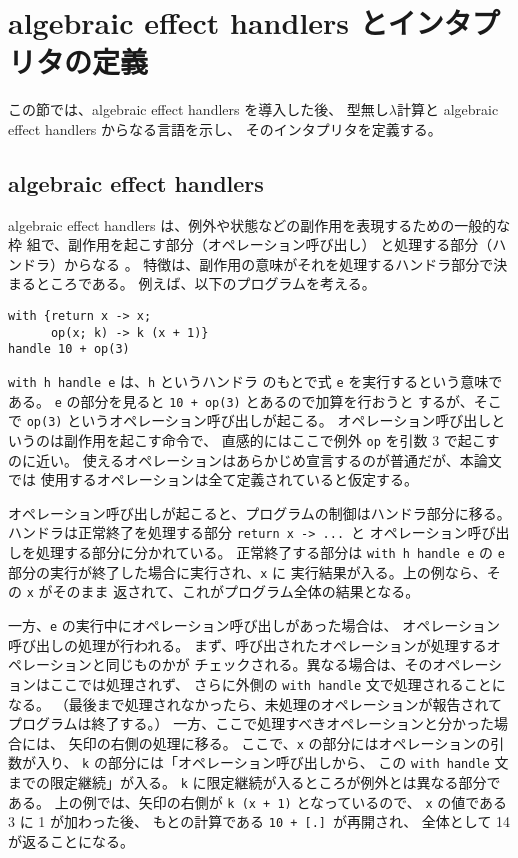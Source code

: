 \section{algebraic effect handlers とインタプリタの定義}
\label{section:definition}

この節では、algebraic effect handlers を導入した後、
型無し$\lambda$計算と algebraic effect handlers からなる言語を示し、
そのインタプリタを定義する。

\subsection{algebraic effect handlers}
\label{subsection:algebraic effect handlers}

algebraic effect handlers は、例外や状態などの副作用を表現するための一般的な枠
組で、副作用を起こす部分（オペレーション呼び出し）
と処理する部分（ハンドラ）からなる \cite{PRETNAR201519}。
特徴は、副作用の意味がそれを処理するハンドラ部分で決まるところである。
例えば、以下のプログラムを考える。
\begin{verbatim}
with {return x -> x;
      op(x; k) -> k (x + 1)}
handle 10 + op(3)
\end{verbatim}
\texttt{with h handle e} は、\texttt{h} というハンドラ
のもとで式 \texttt{e} を実行するという意味である。
\texttt{e} の部分を見ると \texttt{10 + op(3)} とあるので加算を行おうと
するが、そこで \texttt{op(3)} というオペレーション呼び出しが起こる。
オペレーション呼び出しというのは副作用を起こす命令で、
直感的にはここで例外 \texttt{op} を引数 3 で起こすのに近い。
使えるオペレーションはあらかじめ宣言するのが普通だが、本論文では
使用するオペレーションは全て定義されていると仮定する。

オペレーション呼び出しが起こると、プログラムの制御はハンドラ部分に移る。
ハンドラは正常終了を処理する部分 \texttt{return x -> ...}\ と
オペレーション呼び出しを処理する部分に分かれている。
正常終了する部分は
\texttt{with h handle e}
の \texttt{e} 部分の実行が終了した場合に実行され、\texttt{x} に
実行結果が入る。上の例なら、その \texttt{x} がそのまま
返されて、これがプログラム全体の結果となる。

一方、\texttt{e} の実行中にオペレーション呼び出しがあった場合は、
オペレーション呼び出しの処理が行われる。
まず、呼び出されたオペレーションが処理するオペレーションと同じものかが
チェックされる。異なる場合は、そのオペレーションはここでは処理されず、
さらに外側の \texttt{with handle} 文で処理されることになる。
（最後まで処理されなかったら、未処理のオペレーションが報告されて
プログラムは終了する。）
一方、ここで処理すべきオペレーションと分かった場合には、
矢印の右側の処理に移る。
ここで、\texttt{x} の部分にはオペレーションの引数が入り、
\texttt{k} の部分には「オペレーション呼び出しから、
この \texttt{with handle} 文までの限定継続」が入る。
\texttt{k} に限定継続が入るところが例外とは異なる部分である。
上の例では、矢印の右側が \texttt{k (x + 1)} となっているので、
\texttt{x} の値である 3 に 1 が加わった後、
もとの計算である \texttt{10 + [.]}\ が再開され、
全体として 14 が返ることになる。

